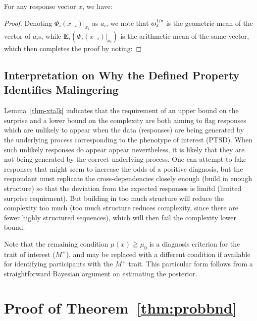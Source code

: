 \documentclass[onecolumn,10pt]{IEEEtran}
\begin{document}
\begin{lem}[Surprise]\label{thm-xtalk}
  For any response vector $x$, we have:
\end{lem}
% 
\begin{proof}
  Denoting $\Phi_i (x_{-i}) \vert_{x_i}$ as $a_i$, we note that $\omega_{x}^{1/n} $ is the geometric mean of the vector of $a_i$s, while $\mathbf{E}_i \left (   \Phi_i (x_{-i}) \vert_{x_i}   \right )$ is the arithmetic mean of the same vector, which then completes the proof by noting:
\end{proof}
% 
\subsection*{Interpretation on Why the Defined Property Identifies Malingering}

Lemma~\ref{thm-xtalk} indicates that the requirement of  an upper bound on the surprise  and a lower bound on the complexity  are  both aiming to flag responses which are   unlikely to appear when the data (responses) are being generated by the  underlying process  corresponding to the phenotype of interest (PTSD).   When such unlikely responses do appear appear nevertheless, it is likely that they  are not being generated by the correct underlying process.  One can attempt to fake responses that might seem to increase the odds of a positive diagnosis, but the respondant must replicate the cross-dependencies closely enough (build in enough structure) so that the deviation from the expected responses is limitd (limited surprise requirment). But building in too much structure will reduce the complexity too much (too much structure reduces complexity, since there are fewer highly structured sequences), which will then fail the complexity lower bound.

Note that the remaining condition $\mu(x) \geqq \mu_0$ is a diagnosis criterion for the trait of interest ($M^+$), and may be replaced with a different condition if available for identifying participants with  the $M^+$ trait. This particular form follows from a straightforward Bayesian argument on estimating the posterior.

\section{Proof of Theorem~\ref{thm:probbnd}}\label{secproof}
\end{document}
